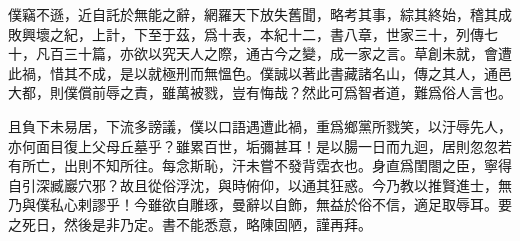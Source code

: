 僕竊不遜，近自託於無能之辭，網羅天下放失舊聞，略考其事，綜其終始，稽其成敗興壞之紀，上計，下至于茲，爲十表，本紀十二，書八章，世家三十，列傳七十，凡百三十篇，亦欲以究天人之際，通古今之變，成一家之言。草創未就，會遭此禍，惜其不成，是以就極刑而無慍色。僕誠以著此書藏諸名山，傳之其人，通邑大都，則僕償前辱之責，雖萬被戮，豈有悔哉？然此可爲智者道，難爲俗人言也。

且負下未易居，下流多謗議，僕以口語遇遭此禍，重爲鄉黨所戮笑，以汙辱先人，亦何面目復上父母丘墓乎？雖累百世，垢彌甚耳！是以腸一日而九迴，居則忽忽若有所亡，出則不知所往。每念斯恥，汗未嘗不發背霑衣也。身直爲閨閤之臣，寧得自引深臧巖穴邪？故且從俗浮沈，與時俯仰，以通其狂惑。今乃教以推賢進士，無乃與僕私心剌謬乎！今雖欲自雕琢，曼辭以自飾，無益於俗不信，適足取辱耳。要之死日，然後是非乃定。書不能悉意，略陳固陋，謹再拜。 

\theendnotes

